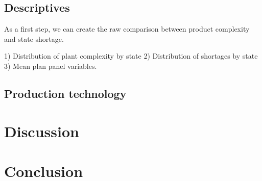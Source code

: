 \documentclass[11pt]{article}
\begin{document}
\subsection{Descriptives}%
\label{sub:descriptives}

As a first step, we can create the raw comparison between product complexity and state shortage.

1) Distribution of plant complexity by state
2) Distribution of shortages by state
3) Mean plan panel variables.

\subsection{Production technology}%
\label{sub:production_technology}


\newpage

\section{Discussion}%
\label{sec:discussion}


\newpage

\section{Conclusion}%
\label{sec:conclusion}


\newpage


\end{document}
